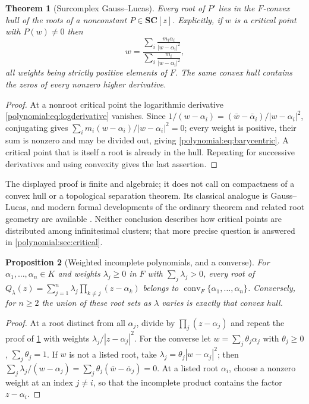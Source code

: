 \documentclass[11pt,letterpaper]{article}
\numberwithin{equation}{section}
\newtheorem{theorem}{Theorem}[section]
\newtheorem{proposition}[theorem]{Proposition}
\theoremstyle{definition}
\theoremstyle{remark}\newtheorem{remark}[theorem]{Remark}
\newcommand{\SC}{\mathbf{SC}}
\newcommand{\conv}{\operatorname{conv}}
\begin{document}
\begin{theorem}[Surcomplex Gauss--Lucas]\label{polynomial:thm:gausslucas}
Every root of $P'$ lies in the $F$-convex hull of the roots of a nonconstant
$P\in\SC[z]$. Explicitly, if $w$ is a critical point with $P(w)\ne0$ then
\begin{equation}\label{polynomial:eq:barycentric}
 w=\frac{\displaystyle\sum_i\frac{m_i\alpha_i}{|w-\alpha_i|^2}}
        {\displaystyle\sum_i\frac{m_i}{|w-\alpha_i|^2}},
\end{equation}
all weights being strictly positive elements of $F$. The same convex hull
contains the zeros of every nonzero higher derivative.
\end{theorem}
\begin{proof}
At a nonroot critical point the logarithmic derivative
\eqref{polynomial:eq:logderivative} vanishes. Since
$1/(w-\alpha_i)=(\bar w-\bar\alpha_i)/|w-\alpha_i|^2$, conjugating gives
$\sum_i m_i(w-\alpha_i)/|w-\alpha_i|^2=0$; every weight is positive, their sum
is nonzero and may be divided out, giving
\eqref{polynomial:eq:barycentric}. A critical point that is itself a root is
already in the hull. Repeating for successive derivatives and using convexity
gives the last assertion.
\end{proof}

The displayed proof is finite and algebraic; it does not call on compactness
of a convex hull or a topological separation theorem. Its classical analogue
is Gauss--Lucas, and modern formal developments of the ordinary theorem and
related root geometry are available \cite{polynomial:Eberl}. Neither
conclusion describes how critical points are distributed among infinitesimal
clusters; that more precise question is answered in
\cref{polynomial:sec:critical}.

\begin{proposition}[Weighted incomplete polynomials, and a converse]
\label{polynomial:prop:weighted}
For $\alpha_1,\ldots,\alpha_n\in K$ and weights $\lambda_j\ge0$ in $F$ with
$\sum_j\lambda_j>0$, every root of
$Q_\lambda(z)=\sum_{j=1}^n\lambda_j\prod_{k\ne j}(z-\alpha_k)$ belongs to
$\conv_F\{\alpha_1,\ldots,\alpha_n\}$. Conversely, for $n\ge2$ the union of
these root sets as $\lambda$ varies is \emph{exactly} that convex hull.
\end{proposition}
\begin{proof}
At a root distinct from all $\alpha_j$, divide by $\prod_j(z-\alpha_j)$ and
repeat the proof of \cref{polynomial:thm:gausslucas} with weights
$\lambda_j/|z-\alpha_j|^2$. For the converse let $w=\sum_j\theta_j\alpha_j$
with $\theta_j\ge0$, $\sum_j\theta_j=1$. If $w$ is not a listed root, take
$\lambda_j=\theta_j|w-\alpha_j|^2$; then
$\sum_j\lambda_j/(w-\alpha_j)=\sum_j\theta_j(\bar w-\bar\alpha_j)=0$.
At a listed root $\alpha_i$, choose a nonzero weight at an index $j\ne i$, so
that the incomplete product contains the factor $z-\alpha_i$.
\end{proof}
\end{document}
